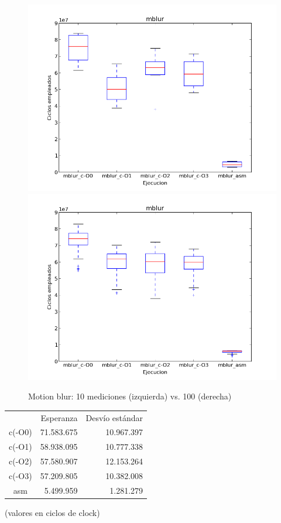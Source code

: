 \documentclass[a4paper]{article}
\begin{document}
\begin{figure}[htbp]
\centering
\includegraphics[scale=0.33]{imagenes/tiemposmblur.png}
\includegraphics[scale=0.33]{imagenes/tiemposmblur100.png}
\caption{Motion blur: 10 mediciones (izquierda) vs. 100 (derecha)}
\label{fig:graficos_mblur}
\end{figure}

\begin{tabular}{c|r|r} %
 & Esperanza & Desvío estándar \\
 c(-O0) & 71.583.675 & 10.967.397 \\
 c(-O1) & 58.938.095 & 10.777.338 \\
 c(-O2) & 57.580.907 & 12.153.264 \\
 c(-O3) & 57.209.805 & 10.382.008 \\
 asm & 5.499.959 & 1.281.279
\end{tabular}
(valores en ciclos de clock)
\end{document}
